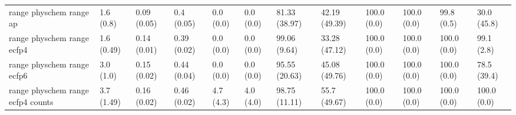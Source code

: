 \begin{tabular}{llllllllllll}
range physchem range ap & {\cellcolor[HTML]{F6FCFD}} \color[HTML]{000000} 1.6 (0.8) & {\cellcolor[HTML]{F7FCFD}} \color[HTML]{000000} 0.09 (0.05) & {\cellcolor[HTML]{90D4C3}} \color[HTML]{000000} 0.4 (0.05) & {\cellcolor[HTML]{F7FCFD}} \color[HTML]{000000} 0.0 (0.0) & {\cellcolor[HTML]{F7FCFD}} \color[HTML]{000000} 0.0 (0.0) & {\cellcolor[HTML]{117B38}} \color[HTML]{F1F1F1} 81.33 (38.97) & {\cellcolor[HTML]{85CFBB}} \color[HTML]{000000} 42.19 (49.39) & {\cellcolor[HTML]{00441B}} \color[HTML]{F1F1F1} 100.0 (0.0) & {\cellcolor[HTML]{00441B}} \color[HTML]{F1F1F1} 100.0 (0.0) & {\cellcolor[HTML]{00441B}} \color[HTML]{F1F1F1} 99.8 (0.5) & {\cellcolor[HTML]{B8E4DB}} \color[HTML]{000000} 30.0 (45.8) \\
range physchem range ecfp4 & {\cellcolor[HTML]{F3FAFC}} \color[HTML]{000000} 1.6 (0.49) & {\cellcolor[HTML]{F4FBFC}} \color[HTML]{000000} 0.14 (0.01) & {\cellcolor[HTML]{92D5C4}} \color[HTML]{000000} 0.39 (0.02) & {\cellcolor[HTML]{F7FCFD}} \color[HTML]{000000} 0.0 (0.0) & {\cellcolor[HTML]{F7FCFD}} \color[HTML]{000000} 0.0 (0.0) & {\cellcolor[HTML]{00471C}} \color[HTML]{F1F1F1} 99.06 (9.64) & {\cellcolor[HTML]{AADFD3}} \color[HTML]{000000} 33.28 (47.12) & {\cellcolor[HTML]{00441B}} \color[HTML]{F1F1F1} 100.0 (0.0) & {\cellcolor[HTML]{00441B}} \color[HTML]{F1F1F1} 100.0 (0.0) & {\cellcolor[HTML]{00441B}} \color[HTML]{F1F1F1} 100.0 (0.0) & {\cellcolor[HTML]{00471C}} \color[HTML]{F1F1F1} 99.1 (2.8) \\
range physchem range ecfp6 & {\cellcolor[HTML]{F6FCFD}} \color[HTML]{000000} 3.0 (1.0) & {\cellcolor[HTML]{F7FCFD}} \color[HTML]{000000} 0.15 (0.02) & {\cellcolor[HTML]{7DCCB5}} \color[HTML]{000000} 0.44 (0.04) & {\cellcolor[HTML]{F7FCFD}} \color[HTML]{000000} 0.0 (0.0) & {\cellcolor[HTML]{F7FCFD}} \color[HTML]{000000} 0.0 (0.0) & {\cellcolor[HTML]{005221}} \color[HTML]{F1F1F1} 95.55 (20.63) & {\cellcolor[HTML]{7ACBB3}} \color[HTML]{000000} 45.08 (49.76) & {\cellcolor[HTML]{00441B}} \color[HTML]{F1F1F1} 100.0 (0.0) & {\cellcolor[HTML]{00441B}} \color[HTML]{F1F1F1} 100.0 (0.0) & {\cellcolor[HTML]{00441B}} \color[HTML]{F1F1F1} 100.0 (0.0) & {\cellcolor[HTML]{18823D}} \color[HTML]{F1F1F1} 78.5 (39.4) \\
range physchem range ecfp4 counts & {\cellcolor[HTML]{F5FBFC}} \color[HTML]{000000} 3.7 (1.49) & {\cellcolor[HTML]{F7FCFD}} \color[HTML]{000000} 0.16 (0.02) & {\cellcolor[HTML]{75C9AF}} \color[HTML]{000000} 0.46 (0.02) & {\cellcolor[HTML]{F0F9FB}} \color[HTML]{000000} 4.7 (4.3) & {\cellcolor[HTML]{F1FAFC}} \color[HTML]{000000} 4.0 (4.0) & {\cellcolor[HTML]{00481D}} \color[HTML]{F1F1F1} 98.75 (11.11) & {\cellcolor[HTML]{55B98F}} \color[HTML]{F1F1F1} 55.7 (49.67) & {\cellcolor[HTML]{00441B}} \color[HTML]{F1F1F1} 100.0 (0.0) & {\cellcolor[HTML]{00441B}} \color[HTML]{F1F1F1} 100.0 (0.0) & {\cellcolor[HTML]{00441B}} \color[HTML]{F1F1F1} 100.0 (0.0) & {\cellcolor[HTML]{00441B}} \color[HTML]{F1F1F1} 100.0 (0.0) \\

\end{tabular}
